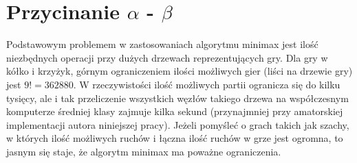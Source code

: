 \documentclass[licencjacka]{pracamgr}
\begin{document}
\section{Przycinanie $\alpha$ - $\beta$}
Podstawowym problemem w zastosowaniach algorytmu minimax jest ilość niezbędnych operacji przy dużych drzewach reprezentujących gry.  Dla gry w kółko i krzyżyk, górnym ograniczeniem ilości możliwych gier (liści na drzewie gry) jest $9! = 362880$. W rzeczywistości ilość możliwych partii ogranicza się do kilku tysięcy, ale i tak przeliczenie wszystkich węzłów takiego drzewa na współczesnym komputerze średniej klasy zajmuje kilka sekund (przynajmniej przy amatorskiej implementacji autora niniejszej pracy). Jeżeli pomyśleć o grach takich jak szachy, w których ilość możliwych ruchów i łączna ilość ruchów w grze jest ogromna, to jasnym się staje, że algorytm minimax ma poważne ograniczenia.  \\
\end{document}
